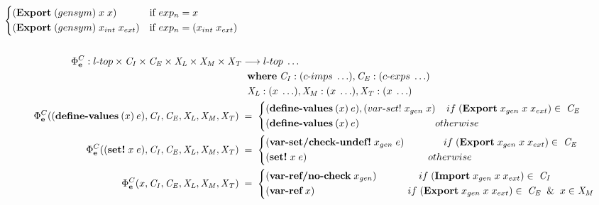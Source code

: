 \documentclass[sigplan,screen,anonymous]{acmart}
\def\dash {\text{-}}
\begin{document}
\begin{figure*}[tbp]
\begin{align*}
\begin{cases*}
      (\textbf{Export}\;(gensym)\;x\;x) & if $exp_n = x$ \\
      (\textbf{Export}\;(gensym)\;x_{int}\;x_{ext}) & if $exp_n = (x_{int}\;x_{ext})$ \\
    \end{cases*} \\ \\
    \Phi^C_{\textbf{e}} : l\dash top \times \mathit{C_I} \times \mathit{C_E} \times \mathit{X_L} \times\mathit{X_M} \times\mathit{X_T} &\longrightarrow l\dash top\; \ldots \\
    \;          &\;\; \where \mathit{C_I} : (c\dash imps\;\ldots), \mathit{C_E} : (c\dash exps\;\ldots) \\
    \;          &\;\; \mathit{X_L} : (x\;\ldots), \mathit{X_M} : (x\;\ldots), \mathit{X_T} : (x\;\ldots) \\
    \Phi^C_{\textbf{e}}((\textbf{define\dash values}\:(x)\:e),\mathit{C_I}, \mathit{C_E}, \mathit{X_L},\mathit{X_M},\mathit{X_T})\; &=\; \begin{cases*}
      (\textbf{define\dash values}\:(x)\:e), (var\dash set!\; x_{gen}\; x)\;\; \;\; if\; (\textbf{Export}\; x_{gen}\; x\; x_{ext}) \in\;\mathit{C_E} \\
      (\textbf{define\dash values}\:(x)\:e) \hspace{2.5cm} \;\; otherwise
    \end{cases*} \\
    \Phi^C_{\textbf{e}}((\textbf{set!}\; x\; e),\mathit{C_I}, \mathit{C_E}, \mathit{X_L},\mathit{X_M},\mathit{X_T})\; &=\; \begin{cases*}
      (\textbf{var\dash set/check\dash undef!}\; x_{gen}\; e) \hspace{1.4cm} if\; (\textbf{Export}\; x_{gen}\; x\; x_{ext}) \in\;\mathit{C_E}\\
      (\textbf{set!}\; x\; e) \hspace{4.3cm} otherwise
    \end{cases*} \\
    \Phi^C_{\textbf{e}}(x,\mathit{C_I}, \mathit{C_E}, \mathit{X_L},\mathit{X_M},\mathit{X_T})\; &=\; \begin{cases*}
      (\textbf{var\dash ref/no\dash check}\; x_{gen}) \hspace{1.5cm} if\; (\textbf{Import}\; x_{gen}\; x\; x_{ext}) \in\;\mathit{C_I} \\
      (\textbf{var\dash ref}\; x) \hspace{3.3cm} if\; (\textbf{Export}\; x_{gen}\; x\; x_{ext}) \in\;\mathit{C_E}\;\; \&\;\; x\in \mathit{X_M} \\

\end{cases*}
\end{align*}
\end{figure*}
\end{document}
